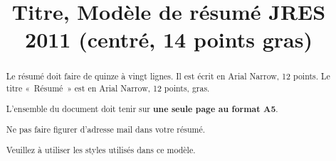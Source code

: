 \documentclass[12pt]{jres-resume}
\title{Titre, Modèle de résumé JRES 2011 (centré, 14 points gras)}
\begin{document}
\maketitle


\begin{abstract}
Le résumé doit faire de quinze à vingt lignes. Il est écrit en Arial
Narrow, 12 points. Le titre «~Résumé~» est en Arial Narrow,
12 points, gras.

L'ensemble du document doit tenir sur \textbf{une seule page au format A5}.

Ne pas faire figurer d'adresse mail dans votre résumé.

Veuillez à utiliser les styles utilisés dans ce modèle.

\end{abstract}
\end{document}
